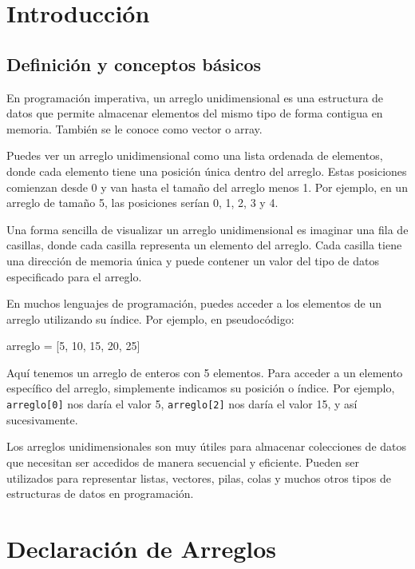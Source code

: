\documentclass{article}
\begin{document}
\renewcommand*\contentsname{Índice de Contenidos}
\tableofcontents

\newpage

\section{Introducción}
\subsection{Definición y conceptos básicos}

En programación imperativa, un arreglo unidimensional es una estructura de datos que permite almacenar elementos del mismo tipo de forma contigua en memoria. También se le conoce como vector o array.

Puedes ver un arreglo unidimensional como una lista ordenada de elementos, donde cada elemento tiene una posición única dentro del arreglo. Estas posiciones comienzan desde 0 y van hasta el tamaño del arreglo menos 1. Por ejemplo, en un arreglo de tamaño 5, las posiciones serían 0, 1, 2, 3 y 4.

Una forma sencilla de visualizar un arreglo unidimensional es imaginar una fila de casillas, donde cada casilla representa un elemento del arreglo. Cada casilla tiene una dirección de memoria única y puede contener un valor del tipo de datos especificado para el arreglo.

En muchos lenguajes de programación, puedes acceder a los elementos de un arreglo utilizando su índice. Por ejemplo, en pseudocódigo:

\begin{c_code}
arreglo = [5, 10, 15, 20, 25]
\end{c_code}

Aquí tenemos un arreglo de enteros con 5 elementos. Para acceder a un elemento específico del arreglo, simplemente indicamos su posición o índice. Por ejemplo, \texttt{arreglo[0]} nos daría el valor 5, \texttt{arreglo[2]} nos daría el valor 15, y así sucesivamente.

Los arreglos unidimensionales son muy útiles para almacenar colecciones de datos que necesitan ser accedidos de manera secuencial y eficiente. Pueden ser utilizados para representar listas, vectores, pilas, colas y muchos otros tipos de estructuras de datos en programación.


\section{Declaración de Arreglos}
\end{document}
